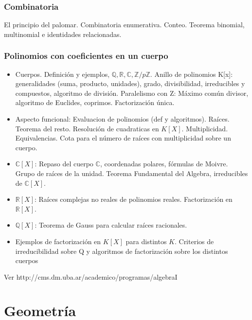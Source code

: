 \documentclass[a4paper,10pt,BCOR10mm,oneside,headsepline]{scrbook}
\begin{document}
\subsubsection{Combinatoria}
 El principio del palomar. Combinatoria enumerativa. Conteo. Teorema binomial, multinomial e identidades relacionadas.


\subsubsection{Polinomios con coeficientes en un cuerpo}

 \begin{itemize}
 \item  Cuerpos. Definición y ejemplos, $\mathbb{Q}, \mathbb{R}, \mathbb{C}, \mathbb{Z}/p\mathbb{Z}$. Anillo de polinomios K[x]: generalidades (suma, producto, unidades), grado, divisibilidad, irreducibles y compuestos,  algoritmo de división. Paralelismo con Z: Máximo común divisor, algoritmo de Euclides, coprimos. Factorización única. 

 \item Aspecto funcional: Evaluacion de polinomios (def y algoritmos). Raíces. Teorema del resto. Resolución de cuadraticas en $K[X]$. Multiplicidad. Equivalencias. Cota para el número de raíces con multiplicidad sobre un cuerpo.

 \item $\mathbb{C}[X]$: Repaso del cuerpo $\mathbb{C}$, coordenadas polares, fórmulas de Moivre.  Grupo de raíces de la unidad. Teorema Fundamental del Algebra, irreducibles de $\mathbb{C}[X]$.  

 \item $\mathbb{R}[X]$: Raíces complejas no reales de polinomios reales.  Factorización en $\mathbb{R}[X]$.

 \item $\mathbb{Q}[X]$: Teorema de Gauss para calcular raíces racionales.

 \item Ejemplos de factorización en $K[X]$ para distintos $K$. Criterios de irreducibilidad sobre Q y algoritmos de factorización sobre los distintos cuerpos
 \end{itemize}

 
Ver http://cms.dm.uba.ar/academico/programas/algebraI


\section{Geometría}
\end{document}

